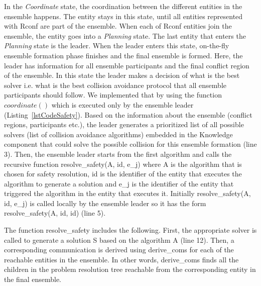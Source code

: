 \documentclass[journal]{IEEEtran}
\theoremstyle{definition}
\newcommand{\ugh}[1]{\textcolor{red}{\uwave{#1}}} %
\newcommand\patrizio[1]{\nb{Patrizio}{#1}}
\newcommand\todo[1]{\nb{Todo}{#1}}
\begin{document}
In the \textit{Coordinate} state, 
the coordination between the different entities in the ensemble happens.  The entity stays in this state, until all entities represented with Rconf are part of the ensemble. 
When each of Rconf entities join the ensemble, the entity
goes into a \textit{Planning} state. The last entity that enters the \textit{Planning} state is the leader. When the leader enters this state,  on-the-fly ensemble formation phase finishes and the final ensemble is formed. 
Here, the leader has information for all ensemble participants and the final conflict region of the ensemble.
In this state the leader makes a decision of what is the best solver i.e.  what is the best collision avoidance protocol that all ensemble participants should follow. We implemented that by using the function $coordinate()$  %
which is executed only by the ensemble leader (Listing~\ref{lstCodeSafety}). 
Based on the information about the ensemble (conflict regions, participants etc.), the leader generates a prioritized list of all possible solvers (list of collision avoidance algorithms) embedded in the Knowledge component that could solve the possible collision for this ensemble formation (line 3). 
Then, the ensemble leader starts from the first algorithm and calls the recursive function resolve\_safety(A, id, e\_j) where A is the algorithm that is chosen for safety resolution, id is the identifier of the entity that executes the algorithm to generate a solution and e\_j is the identifier of the entity that triggered the algorithm in the entity that executes it. 
Initially resolve\_safety(A, id, e\_j) is called locally by the ensemble leader so it has the form resolve\_safety(A, id, id) (line 5).

The function resolve\_safety includes the following.
First, the appropriate solver is called to generate a solution S based on the algorithm A (line 12). 
Then, a corresponding communication is derived using derive\_coms for each of the reachable entities in the ensemble. In other words, derive\_coms finds all the children in the problem resolution tree reachable from the corresponding entity in the final ensemble.
\end{document}
